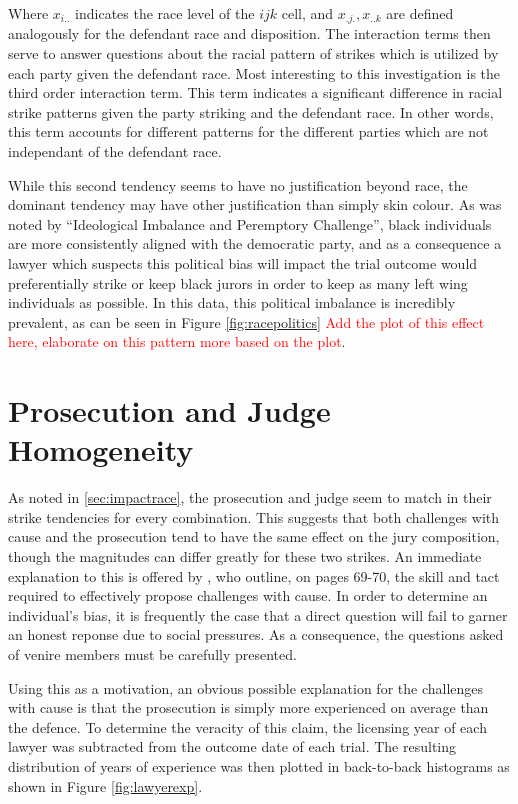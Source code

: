 Where $x_{i..}$ indicates the race level of the $ijk$ cell, and $x_{.j.},x_{..k}$ are defined analogously for the defendant race
and disposition. The interaction terms then serve to answer questions about the racial pattern of strikes which is utilized by
each party given the defendant race. Most interesting to this investigation is the third order interaction term. This term
indicates a significant difference in racial strike patterns given the party striking and the defendant race. In other words, this
term accounts for different patterns for the different parties which are not independant of the defendant race.

While this second tendency seems to have no justification beyond race, the dominant tendency may have other justification than
simply skin colour. As was noted by ``Ideological Imbalance and Peremptory Challenge'', black individuals are more consistently
aligned with the democratic party, and as a consequence a lawyer which suspects this political bias will impact the trial outcome
would preferentially strike or keep black jurors in order to keep as many left wing individuals as possible. In this data, this
political imbalance is incredibly prevalent, as can be seen in Figure \ref{fig:racepolitics} \textcolor{red}{Add the plot of this
  effect here, elaborate on this pattern more based on the plot}.

\section{Prosecution and Judge Homogeneity} \label{sec:causepro}

As noted in \ref{sec:impactrace}, the prosecution and judge seem to match in their strike tendencies for every combination. This
suggests that both challenges with cause and the prosecution tend to have the same effect on the jury composition, though the
magnitudes can differ greatly for these two strikes. An immediate explanation to this is offered by \cite{hansvidjudging}, who
outline, on pages 69-70, the skill and tact required to effectively propose challenges with cause. In order to determine an
individual's bias, it is frequently the case that a direct question will fail to garner an honest reponse due to social pressures.
As a consequence, the questions asked of venire members must be carefully presented.

Using this as a motivation, an obvious possible explanation for the challenges with cause is that the prosecution is simply more
experienced on average than the defence. To determine the veracity of this claim, the licensing year of each lawyer was subtracted
from the outcome date of each trial. The resulting distribution of years of experience was then plotted in back-to-back histograms
as shown in Figure \ref{fig:lawyerexp}.

